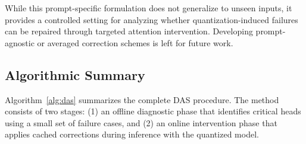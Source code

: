 While this prompt-specific formulation does not generalize
to unseen inputs, it provides a controlled setting
for analyzing whether quantization-induced failures
can be repaired through targeted attention intervention.
Developing prompt-agnostic or averaged correction schemes
is left for future work.

\subsection{Algorithmic Summary}

Algorithm~\ref{alg:das} summarizes the complete DAS procedure.
The method consists of two stages:
(1) an offline diagnostic phase that identifies critical heads using a small set
of failure cases, and
(2) an online intervention phase that applies cached corrections during
inference with the quantized model.




